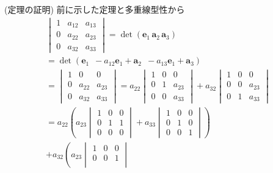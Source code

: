 \documentclass[openany, a4paper, oneside]{jsbook}
\theoremstyle{break}
\theoremstyle{breakdefn}
\begin{document}
(定理の証明)
前に示した定理と多重線型性から
    \begin{gather}
        \begin{vmatrix} 1 & a_{12} & a_{13} \\
                              0 & a_{22} & a_{23} \\
                              0 & a_{32} & a_{33}
        \end{vmatrix}
        =
        \det (\bm{e}_{1} \, \bm{a}_{2} \, \bm{a}_{3} )  \\
        =
        \det (\bm{e}_{1} \,\,\, -a_{12}\bm{e}_{1} + \bm{a}_{2} \,\,\, -a_{13}\bm{e}_{1} + \bm{a}_{3} )\\
        =
        \begin{vmatrix} 1 & 0 & 0 \\
                        0 & a_{22} & a_{23} \\
                        0 & a_{32} & a_{33}
        \end{vmatrix}
        =
        a_{22}\begin{vmatrix} 1 & 0 & 0 \\
                              0 & 1 & a_{23} \\
                              0 & 0 & a_{33}
        \end{vmatrix}
        +a_{32}\begin{vmatrix} 1 & 0 & 0 \\
                                0 & 0 & a_{23} \\
                                0 & 1 & a_{33}
        \end{vmatrix} \\
        =
        a_{22} \left (
        a_{23}\begin{vmatrix} 1 & 0 & 0 \\
                              0 & 1 & 1 \\
                              0 & 0 & 0
        \end{vmatrix}
        +a_{33}\begin{vmatrix} 1 & 0 & 0 \\
                               0 & 1 & 0 \\
                               0 & 0 & 1
        \end{vmatrix}
        \right) \\
        +a_{32}\left (
        a_{23}\begin{vmatrix} 1 & 0 & 0 \\
                              0 & 0 & 1 \\

\end{vmatrix}
\end{gather}
\end{document}
